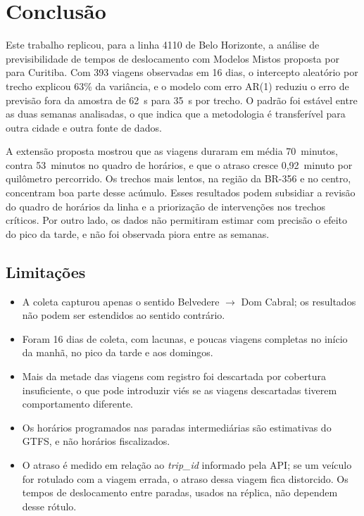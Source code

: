 \section{Conclusão}
\label{sec:conclusao}

Este trabalho replicou, para a linha 4110 de Belo Horizonte, a análise de previsibilidade de
tempos de deslocamento com Modelos Mistos proposta por \cite{courb} para
Curitiba. Com 393 viagens observadas em 16 dias, o intercepto aleatório por trecho explicou
63\% da variância, e o modelo com erro AR(1) reduziu o erro de previsão fora da amostra de
62~s para 35~s por trecho. O padrão foi estável entre as duas semanas analisadas, o que indica
que a metodologia é transferível para outra cidade e outra fonte de dados.

A extensão proposta mostrou que as viagens duraram em média 70~minutos, contra 53~minutos no
quadro de horários, e que o atraso cresce 0,92~minuto por quilômetro percorrido. Os trechos
mais lentos, na região da BR-356 e no centro, concentram boa parte desse acúmulo. Esses
resultados podem subsidiar a revisão do quadro de horários da linha e a priorização de
intervenções nos trechos críticos. Por outro lado, os dados não permitiram estimar com
precisão o efeito do pico da tarde, e não foi observada piora entre as semanas.

\subsection{Limitações}

\begin{itemize}
  \item A coleta capturou apenas o sentido Belvedere $\rightarrow$ Dom Cabral; os resultados
        não podem ser estendidos ao sentido contrário.
  \item Foram 16 dias de coleta, com lacunas, e poucas viagens completas no início da manhã,
        no pico da tarde e aos domingos.
  \item Mais da metade das viagens com registro foi descartada por cobertura insuficiente,
        o que pode introduzir viés se as viagens descartadas tiverem comportamento diferente.
  \item Os horários programados nas paradas intermediárias são estimativas do GTFS, e não
        horários fiscalizados.
  \item O atraso é medido em relação ao \textit{trip\_id} informado pela API; se um veículo
        for rotulado com a viagem errada, o atraso dessa viagem fica distorcido. Os tempos de
        deslocamento entre paradas, usados na réplica, não dependem desse rótulo.
\end{itemize}

